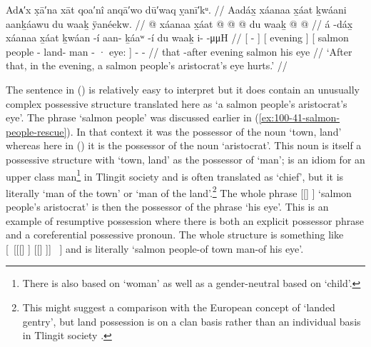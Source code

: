 \ex\label{ex:100-74-salmon-chief-eye-hurts}%
%
\begingl
	\glpreamble	Adᴀ′x x̣ā′na xāt qoa′nî anqā′wo dū′waq ỵanī′kᵘ. //
	\glpreamble	Aadáx̱ xáanaa x̱áat ḵwáani aanḵáawu du waaḵ ÿanéekw. //
	\gla	{}  @ {} {} 
		{} xáanaa {} 
		{} x̱áat  @ {} 
			 @ {} @ {} 
			du waaḵ {} 
		 @ {} @ {} //
	\glb	{} á -dáx̱ {} 
		{} xáanaa {} 
		{} x̱áat ḵwáan -í 
			aan- ḵáaʷ -í 
			du waaḵ {}
		i-  -μμH //
	\glc	{}[  - {}]
		{}[ evening {}]
		{}[ salmon people - 
			land- man - 
			· eye: {}]
		-  - //
	\gld	{} that -after {}
		{} evening {}
		{} salmon  {} 
			 {} {} 
			his eye {}
		 {} {} {} {} {} //
	\glft	‘After that, in the evening, a salmon people’s aristocrat’s eye hurts.’
		//
\endgl
\xe

The sentence in (\lastx) is relatively easy to interpret but it does contain an unusually complex possessive structure translated here as ‘a salmon people’s aristocrat’s eye’.
The phrase  ‘salmon people’ was discussed earlier in (\ref{ex:100-41-salmon-people-rescue}).
In that context it was the possessor of the noun  ‘town, land’ whereas here in (\lastx) it is the possessor of the noun  ‘aristocrat’.
This noun is itself a possessive structure with  ‘town, land’ as the possessor of  ‘man’;  is an idiom for an upper class man\footnote{There is also  based on  ‘woman’ as well as a gender-neutral  based on  ‘child’.} in Tlingit society and is often translated as ‘chief’, but it is literally ‘man of the town’ or ‘man of the land’.\footnote{This might suggest a comparison with the European concept of ‘landed gentry’, but land possession is on a clan basis rather than an individual basis in Tlingit society \parencites{goldschmidt-haas:1998}{thornton:2012}.} The whole phrase [[] ] ‘salmon people’s aristocrat’ is then the possessor of the phrase  ‘his eye’.
This is an example of resumptive possession where there is both an explicit possessor phrase and a coreferential possessive pronoun.
The whole structure is something like [~[[[] ] [[] ]]  ~] and is literally ‘salmon people-of town man-of his eye’.

